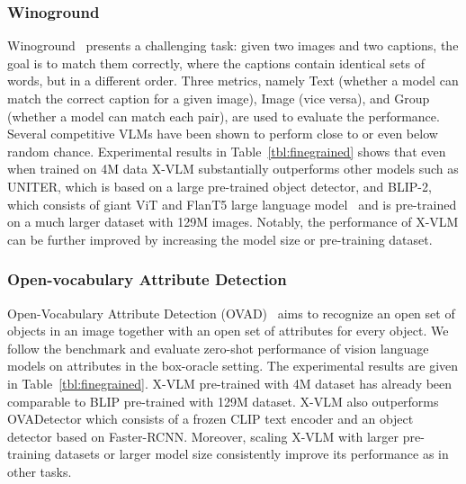 \documentclass{article}
\newcommand{\baby}{X-VLM\xspace}
\newcommand{\babyB}{X-VLM\xspace}
\begin{document}
\subsubsection{Winoground}
Winoground~\cite{thrush2022winoground} presents a challenging task: given two images and two captions, the goal is to match them correctly, where the captions contain identical sets of words, but in a different order. Three metrics, namely Text (whether a model can match the correct caption for a given image), Image (vice versa), and Group (whether a model can match each pair), are used to evaluate the performance. Several competitive VLMs have been shown to perform close to or even below random chance. Experimental results in Table~\ref{tbl:finegrained} shows that even when trained on 4M data \baby substantially outperforms other models such as UNITER, which is based on a large pre-trained object detector, and BLIP-2, which consists of giant ViT and FlanT5 large language model~\cite{chung2022scaling} and is pre-trained on a much larger dataset with 129M images. Notably, the performance of \baby can be further improved by increasing the model size or pre-training dataset. 


\subsubsection{Open-vocabulary Attribute Detection}
Open-Vocabulary Attribute Detection (OVAD)~\cite{bravo2023open} aims to recognize an open set of objects in an image together with an open set of attributes for every object. We follow the benchmark and evaluate zero-shot performance of vision language models on attributes in the box-oracle setting. The experimental results are given in Table~\ref{tbl:finegrained}. \babyB pre-trained with 4M dataset has already been comparable to BLIP pre-trained with 129M dataset. \babyB also outperforms OVADetector which consists of a frozen CLIP text encoder and an object detector based on Faster-RCNN. Moreover, scaling \baby with larger pre-training datasets or larger model size consistently improve its performance as in other tasks. 
\end{document}
